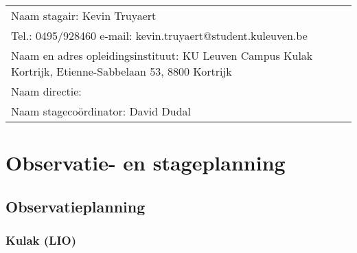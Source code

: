 
\begin{landscape}
	
	\begin{tabularx}{1.56\textwidth}{|X|}
		\hline
		Naam stagair:  Kevin Truyaert  \\
		Tel.: 0495/928460 \hspace{3cm} e-mail: kevin.truyaert@student.kuleuven.be  \\
		Naam en adres opleidingsinstituut:  KU Leuven Campus Kulak Kortrijk, Etienne-Sabbelaan 53, 8800 Kortrijk  \\
		Naam directie: \\
		Naam stagecoördinator:  David Dudal \\
		\hline
	\end{tabularx}
	\vspace*{-0.4cm}
\section{Observatie- en stageplanning}
\vspace*{-0.3cm}\subsection{Observatieplanning}
\subsubsection{Kulak (LIO)}%
\begin{minipage}[b]{\textwidth}
	
\end{minipage}


\end{landscape}
